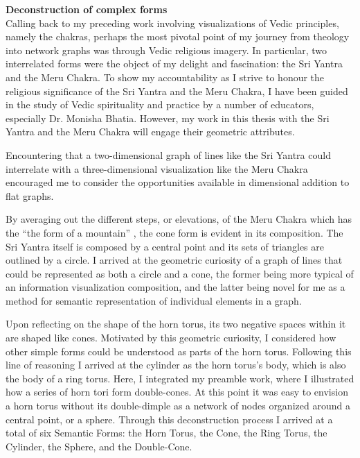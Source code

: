 \noindent \textbf{Deconstruction of complex forms}
\\
Calling back to my preceding work involving visualizations of Vedic principles, namely the chakras, perhaps the most pivotal point of my journey from theology into network graphs was through Vedic religious imagery. In particular, two interrelated forms were the object of my delight and fascination: the Sri Yantra and the Meru Chakra. To show my accountability as I strive to honour the religious significance of the Sri Yantra and the Meru Chakra, I have been guided in the study of Vedic spirituality and practice by a number of educators, especially Dr. Monisha Bhatia. However, my work in this thesis with the Sri Yantra and the Meru Chakra will engage their geometric attributes. 
  

Encountering that a two-dimensional graph of lines like the Sri Yantra could interrelate with a three-dimensional visualization like the Meru Chakra encouraged me to consider the opportunities available in dimensional addition to flat graphs. 
  

By averaging out the different steps, or elevations, of the Meru Chakra which has the “the form of a mountain” \citep[p. 31]{buhnemann_mandalas_2003}, the cone form is evident in its composition. The Sri Yantra itself is composed by a central point and its sets of triangles are outlined by a circle. I arrived at the geometric curiosity of a graph of lines that could be represented as both a circle and a cone, the former being more typical of an information visualization composition, and the latter being novel for me as a method for semantic representation of individual elements in a graph. 
  

Upon reflecting on the shape of the horn torus, its two negative spaces within it are shaped like cones. Motivated by this geometric curiosity, I considered how other simple forms could be understood as parts of the horn torus. Following this line of reasoning I arrived at the cylinder as the horn torus’s body, which is also the body of a ring torus. Here, I integrated my preamble work, where I illustrated how a series of horn tori form double-cones. At this point it was easy to envision a horn torus without its double-dimple as a network of nodes organized around a central point, or a sphere. Through this deconstruction process I arrived at a total of six Semantic Forms: the Horn Torus, the Cone, the Ring Torus, the Cylinder, the Sphere, and the Double-Cone. 


